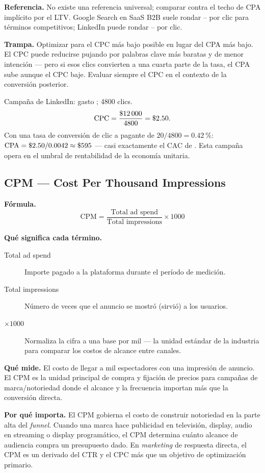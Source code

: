 \textbf{Referencia.} No existe una referencia universal; comparar contra el techo de CPA
implícito por el LTV. Google Search en SaaS B2B suele rondar -- por clic
para términos competitivos; LinkedIn puede rondar -- por clic.

\textbf{Trampa.} Optimizar para el CPC más bajo posible en lugar del CPA más bajo. El CPC
puede reducirse pujando por palabras clave más baratas y de menor intención --- pero si esos
clics convierten a una cuarta parte de la tasa, el CPA sube aunque el CPC baje. Evaluar
siempre el CPC en el contexto de la conversión posterior.

\begin{example}
Campaña de LinkedIn: gasto ; \num{4800} clics.
\[
  \mathrm{CPC} = \frac{\$\num{12000}}{4800} = \$\num{2.50}.
\]
Con una tasa de conversión de clic a pagante de $20/4800 = \qty{0.42}{\percent}$:
$\mathrm{CPA} = \$\num{2.50}/0.0042 \approx \$\num{595}$ --- casi exactamente el CAC de
. Esta campaña opera en el umbral de rentabilidad de la economía unitaria.
\end{example}


\subsection{CPM --- Cost Per Thousand Impressions}

\textbf{Fórmula.}
\[
  \mathrm{CPM} = \frac{\text{Total ad spend}}{\text{Total impressions}} \times 1000
\]

\textbf{Qué significa cada término.}
\begin{description}
  \item[Total ad spend] Importe pagado a la plataforma durante el período de medición.
  \item[Total impressions] Número de veces que el anuncio se mostró (sirvió) a los usuarios.
  \item[$\times 1000$] Normaliza la cifra a una base por mil --- la unidad estándar de la
    industria para comparar los costos de alcance entre canales.
\end{description}

\textbf{Qué mide.} El costo de llegar a mil espectadores con una impresión de anuncio. El
CPM es la unidad principal de compra y fijación de precios para campañas de
marca/notoriedad donde el alcance y la frecuencia importan más que la conversión directa.

\textbf{Por qué importa.} El CPM gobierna el costo de construir notoriedad en la parte alta
del \emph{funnel}. Cuando una marca hace publicidad en televisión, display, audio en
streaming o display programático, el CPM determina cuánto alcance de audiencia compra un
presupuesto dado. En \emph{marketing} de respuesta directa, el CPM es un derivado del CTR
y el CPC más que un objetivo de optimización primario.

